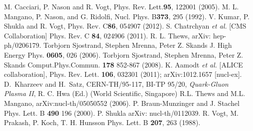 \documentclass[aps,prc,preprint,superscriptaddress,showpacs,showkeys]{revtex4-1}
\begin{document}
\begin{thebibliography}{100}
 M. Cacciari, P. Nason and R. Vogt, Phys. Rev. Lett.{\bf 95}, 122001 (2005).
 M. L. Mangano, P. Nason, and G. Ridolfi, Nucl. Phys. B{\bf 373}, 295 (1992).
 V. Kumar, P. Shukla and R. Vogt, Phys. Rev. C{\bf 86}, 054907 (2012).
 S. Chatrchyan {\it et al.} [CMS Collaboration] Phys. Rev. C {\bf 84}, 024906 (2011).
R. L. Thews, arXiv: hep-ph/0206179.
 Torbjorn Sjostrand, Stephen Mrenna, Peter Z. Skands J. High Energy Phys. {\bf 0605}, 026 (2006). 
 Torbjorn Sjostrand, Stephen Mrenna, Peter Z. Skands Comput.Phys.Commun. {\bf 178} 852-867 (2008).
 K. Aamodt {\it et al.} [ALICE collaboration], Phys. Rev. Lett. {\bf 106}, 032301 (2011);
          arXiv:1012.1657 [nucl-ex].
D.~Kharzeev and H.~Satz, CERN-TH/95-117, BI-TP 95/20,
         {\it Quark-Gluon Plasma II}, R. C. Hwa (Ed.) (World Scientific, Singapore)
 R.L. Thews and M.L. Mangano, arXiv:nucl-th/05050552 (2006).
 P. Braun-Munzinger and J. Stachel Phys. Lett. B {\bf 490} 196 (2000).
 P. Shukla arXiv: nucl-th/0112039. 
 R. Vogt, M. Prakash, P. Koch, T. H. Hunsson Phys. Lett. B {\bf 207}, 263 (1988). 
\end{thebibliography}
\end{document}
